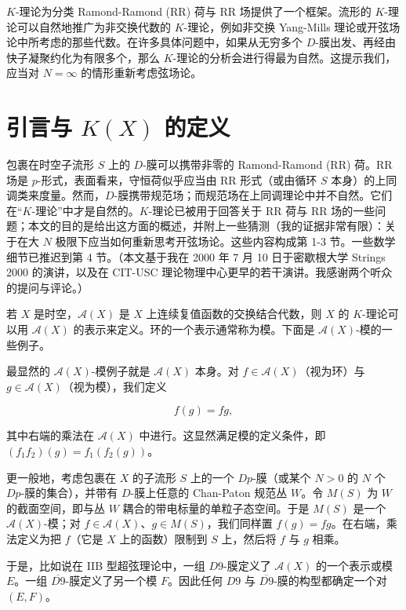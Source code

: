 \(K\)-理论为分类 Ramond-Ramond (RR) 荷与 RR 场提供了一个框架。流形的 \(K\)-理论可以自然地推广为非交换代数的 \(K\)-理论，例如非交换 Yang-Mills 理论或开弦场论中所考虑的那些代数。在许多具体问题中，如果从无穷多个 \(D\)-膜出发、再经由快子凝聚约化为有限多个，那么 \(K\)-理论的分析会进行得最为自然。这提示我们，应当对 \(N=\infty\) 的情形重新考虑弦场论。

\section{\texorpdfstring{引言与 \(K(X)\) 的定义}{引言与 K(X) 的定义}}

包裹在时空子流形 \(S\) 上的 \(D\)-膜可以携带非零的 Ramond-Ramond (RR) 荷。RR 场是 \(p\)-形式，表面看来，守恒荷似乎应当由 RR 形式（或由循环 \(S\) 本身）的上同调类来度量。然而，\(D\)-膜携带规范场；而规范场在上同调理论中并不自然。它们在“\(K\)-理论”中才是自然的。\(K\)-理论已被用于回答关于 RR 荷与 RR 场的一些问题；本文的目的是给出这方面的概述，并附上一些猜测（我的证据非常有限）：关于在大 \(N\) 极限下应当如何重新思考开弦场论。这些内容构成第 1-3 节。一些数学细节已推迟到第 4 节。（本文基于我在 2000 年 7 月 10 日于密歇根大学 Strings 2000 的演讲，以及在 CIT-USC 理论物理中心更早的若干演讲。我感谢两个听众的提问与评论。）

若 \(X\) 是时空，\(\mathcal{A}(X)\) 是 \(X\) 上连续复值函数的交换结合代数，则 \(X\) 的 \(K\)-理论可以用 \(\mathcal{A}(X)\) 的表示来定义。环的一个表示通常称为模。下面是 \(\mathcal{A}(X)\)-模的一些例子。

最显然的 \(\mathcal{A}(X)\)-模例子就是 \(\mathcal{A}(X)\) 本身。对 \(f\in  \mathcal{A}(X)\)（视为环）与 \(g\in \mathcal{A}(X)\)（视为模），我们定义

\begin{equation}\tag{1.1}\label{eq:1.1}
f(g)=fg,
\end{equation}

其中右端的乘法在 \(\mathcal{A}(X)\) 中进行。这显然满足模的定义条件，即 \((f_1f_2)(g)=f_1(f_2(g))\)。

更一般地，考虑包裹在 \(X\) 的子流形 \(S\) 上的一个 \(Dp\)-膜（或某个 \(N>0\) 的 \(N\) 个 \(Dp\)-膜的集合），并带有 \(D\)-膜上任意的 Chan-Paton 规范丛 \(W\)。令 \(M(S)\) 为 \(W\) 的截面空间，即与丛 \(W\) 耦合的带电标量的单粒子态空间。于是 \(M(S)\) 是一个 \(\mathcal{A}(X)\)-模；对 \(f\in \mathcal{A}(X)\)、\(g\in M(S)\)，我们同样置 \(f(g)=fg\)。在右端，乘法定义为把 \(f\)（它是 \(X\) 上的函数）限制到 \(S\) 上，然后将 \(f\) 与 \(g\) 相乘。

于是，比如说在 IIB 型超弦理论中，一组 \(D9\)-膜定义了 \(\mathcal{A}(X)\) 的一个表示或模 \(E\)。一组 \(\overline{D9}\)-膜定义了另一个模 \(F\)。因此任何 \(D9\) 与 \(\overline{D9}\)-膜的构型都确定一个对 \((E,F)\)。


